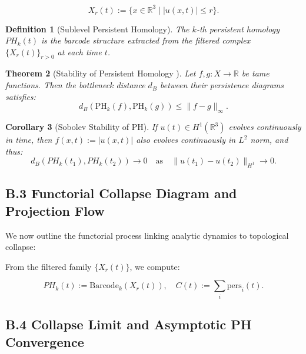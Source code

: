 \documentclass[11pt]{article}
\newtheorem{theorem}{Theorem}[section]
\newtheorem{definition}[theorem]{Definition}
\newtheorem{corollary}[theorem]{Corollary}
\begin{document}
\[
X_r(t) := \{ x \in \mathbb{R}^3 \mid |u(x,t)| \leq r \}.
\]

\begin{definition}[Sublevel Persistent Homology]
The $k$-th persistent homology $PH_k(t)$ is the barcode structure extracted from the filtered complex $\{ X_r(t) \}_{r > 0}$ at each time $t$.
\end{definition}

\begin{theorem}[Stability of Persistent Homology {\cite{CohenSteiner2007}}]
Let $f, g: X \to \mathbb{R}$ be tame functions. Then the bottleneck distance $d_B$ between their persistence diagrams satisfies:
\[
d_B(\mathrm{PH}_k(f), \mathrm{PH}_k(g)) \leq \|f - g\|_\infty.
\]
\end{theorem}

\begin{corollary}[Sobolev Stability of PH]
If $u(t) \in H^1(\mathbb{R}^3)$ evolves continuously in time, then $f(x,t) := |u(x,t)|$ also evolves continuously in $L^2$ norm, and thus:
\[
d_B(PH_k(t_1), PH_k(t_2)) \to 0 \quad \text{as} \quad \|u(t_1) - u(t_2)\|_{H^1} \to 0.
\]
\end{corollary}



\subsection*{B.3 Functorial Collapse Diagram and Projection Flow}

We now outline the functorial process linking analytic dynamics to topological collapse:

\begin{center}
\end{center}

From the filtered family $\{X_r(t)\}$, we compute:

\[
PH_k(t) := \mathrm{Barcode}_k(X_r(t)),
\quad C(t) := \sum_i \text{pers}_i(t).
\]



\subsection*{B.4 Collapse Limit and Asymptotic PH Convergence}
\end{document}

